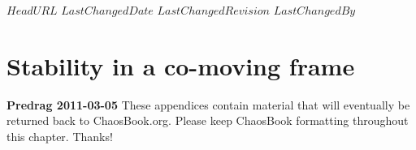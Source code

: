 \ifsvnmulti
 \svnidlong
 {$HeadURL$}
 {$LastChangedDate$}
 {$LastChangedRevision$} {$LastChangedBy$}
\fi

\renewcommand{\ssp}{x}            %


\section{Stability in a co-moving frame}
\label{sect:stabComoving}

{\bf Predrag 2011-03-05}
{These appendices contain material that will eventually be returned back to
    ChaosBook.org. Please keep ChaosBook formatting throughout this chapter.
    Thanks!}

